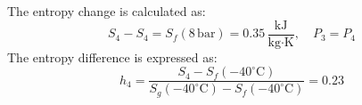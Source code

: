 The entropy change is calculated as:  
\[
S_4 - S_4 = S_f(8 \, \text{bar}) = 0.35 \, \frac{\text{kJ}}{\text{kg·K}}, \quad P_3 = P_4
\]  
The entropy difference is expressed as:  
\[
h_4 = \frac{S_4 - S_f(-40^\circ\text{C})}{S_g(-40^\circ\text{C}) - S_f(-40^\circ\text{C})} = 0.23
\]